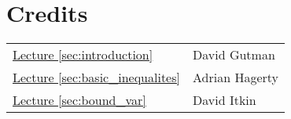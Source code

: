 \documentclass{amsproc}
\newcommand{\fref}[2]{\hyperref[#2]{#1 \ref*{#2}}}
\begin{document}

\appendix
\newpage
\section*{Credits}
\begin{tabular}{ll}
	\fref{Lecture}{sec:introduction}
	&David Gutman
	\\
	\fref{Lecture}{sec:basic_inequalites}
	&Adrian Hagerty
	\\
	\fref{Lecture}{sec:bound_var}
	& David Itkin
\end{tabular}



\end{document}
